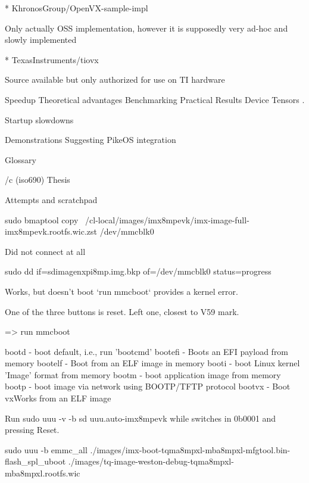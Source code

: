 * KhronosGroup/OpenVX-sample-impl

Only actually OSS implementation, however it is supposedly very ad-hoc and slowly implemented

* TexasInstruments/tiovx

Source available but only authorized for use on TI hardware
\enditems


\chap Speedup
\sec Theoretical advantages
\sec Benchmarking Practical Results
\sec Device Tensors
.

\sec Startup slowdowns

\chap Demonstrations
\chap Suggesting PikeOS integration

\app Glossary

\makeglos

\bibchap
\usebib/c (iso690) Thesis

\app Attempts and scratchpad

\sec sudo bmaptool copy ~/cl-local/images/imx8mpevk/imx-image-full-imx8mpevk.rootfs.wic.zst /dev/mmcblk0

Did not connect at all

\sec sudo dd if=sdimagenxpi8mp.img.bkp of=/dev/mmcblk0 status=progress

Works, but doesn't boot `run mmcboot` provides a kernel error.

One of the three buttons is reset.
Left one, closest to V59 mark.

=> run mmcboot


bootd     - boot default, i.e., run 'bootcmd'
bootefi   - Boots an EFI payload from memory
bootelf   - Boot from an ELF image in memory
booti     - boot Linux kernel 'Image' format from memory
bootm     - boot application image from memory
bootp     - boot image via network using BOOTP/TFTP protocol
bootvx    - Boot vxWorks from an ELF image

Run sudo uuu -v -b sd uuu.auto-imx8mpevk
while switches in 0b0001 and pressing Reset.

sudo uuu -b emmc_all ./images/imx-boot-tqma8mpxl-mba8mpxl-mfgtool.bin-flash_spl_uboot ./images/tq-image-weston-debug-tqma8mpxl-mba8mpxl.rootfs.wic

